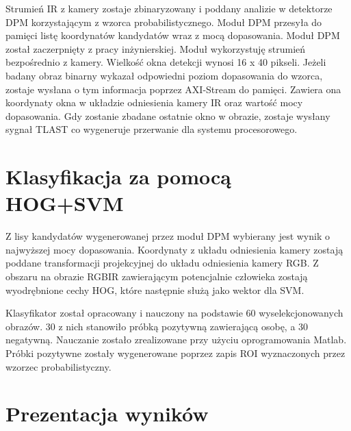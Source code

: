 Strumień IR z kamery zostaje zbinaryzowany i poddany analizie w detektorze DPM korzystającym z wzorca probabilistycznego.  %
Moduł DPM przesyła do pamięci listę koordynatów kandydatów wraz z mocą dopasowania. %
Moduł DPM został zaczerpnięty z pracy inżynierskiej. %
Moduł wykorzystuję strumień bezpośrednio z kamery. %
Wielkość okna detekcji wynosi 16 x 40 pikseli. 
Jeżeli badany obraz binarny wykazał odpowiedni poziom dopasowania do wzorca, zostaje wysłana o tym informacja poprzez AXI-Stream do pamięci. 
Zawiera ona koordynaty okna w układzie odniesienia kamery IR oraz wartość mocy dopasowania. 
Gdy zostanie zbadane ostatnie okno w obrazie, zostaje wysłany sygnał TLAST co wygeneruje przerwanie dla systemu procesorowego.



\section{Klasyfikacja za pomocą HOG+SVM}

Z lisy kandydatów wygenerowanej przez moduł DPM wybierany jest wynik o najwyższej mocy dopasowania. %
Koordynaty z układu odniesienia kamery zostają poddane transformacji projekcyjnej do układu odniesienia kamery RGB. 
Z obszaru na obrazie RGBIR zawierającym potencjalnie człowieka zostają wyodrębnione cechy HOG, które następnie służą jako wektor dla SVM.

Klasyfikator został opracowany i nauczony na podstawie 60 wyselekcjonowanych obrazów. %
30 z nich stanowiło próbką pozytywną zawierającą osobę, a 30 negatywną. 
Nauczanie zostało zrealizowane przy użyciu oprogramowania Matlab. 
Próbki pozytywne zostały wygenerowane poprzez zapis ROI wyznaczonych przez wzorzec probabilistyczny. 


\section{Prezentacja wyników}

